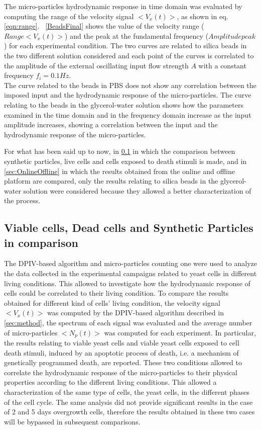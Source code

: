 \documentclass[journal]{IEEEtran}
\theoremstyle{definition}
\theoremstyle{remark}
\begin{document}
The micro-particles hydrodynamic response in time domain was evaluated by computing the range of the velocity signal $<V_x(t)>$, as shown in eq. \ref{eqn:range}. ~\fig\ref{BeadsFinal} shows the value of the velocity range ($Range<V_x(t)>$) and the peak at the fundamental frequency ($Amplitude peak$) for each experimental condition. The two curves are related to silica beads in the two different solution considered and each point of the curves is correlated to the amplitude of the external oscillating input flow strength $A$ with a constant frequency $f_i= 0.1 Hz$. 
\\The curve related to the beads in PBS does not show any correlation between the imposed input and the hydrodynamic response of the micro-particles. The curve relating to the beads in the glycerol-water solution shows how the parameters examined in the time domain and in the frequency domain increase as the input amplitude increases, showing a correlation between the input and the hydrodynamic response of the micro-particles.

For what has been said up to now, in \sect\ref{sec:comparison} in which the comparison between synthetic particles, live cells and cells exposed to death stimuli is made, and in \sect\ref{sec:OnlineOffline} in which the results obtained from the online and offline platform are compared, only the results relating to silica beads in the glycerol-water solution were considered because they allowed a better characterization of the process.

\subsection{Viable cells, Dead cells and Synthetic Particles in comparison}\label{sec:comparison}

The DPIV-based algorithm and micro-particles counting one were used to analyze the data collected in the experimental campaigns related to yeast cells in different living conditions. This allowed to investigate how the hydrodynamic response of cells could be correlated to their living condition.  To compare the results obtained for different kind of cells' living condition, the velocity signal $<V_x(t)>$ was computed by the DPIV-based algorithm described in \sect\ref{sec:method}, the spectrum of each signal was evaluated and the average number of micro-particles $<N_p(t)>$ was computed for each experiment. 
In particular, the results relating to viable yeast cells and viable yeast cells exposed to cell death stimuli, induced by an apoptotic process of death, i.e. a mechanism of genetically programmed death, are reported. These two conditions allowed to correlate the hydrodynamic response of the micro-particles to their physical properties according to the different living conditions. This allowed a characterization of the same type of cells, the yeast cells, in the different phases of the cell cycle.
The same analysis did not provide significant results in the case of 2 and 5 days overgrowth cells, therefore the results obtained in these two cases will be bypassed in subsequent comparisons.
\end{document}
